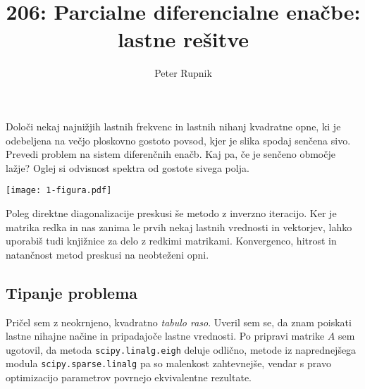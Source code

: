 \documentclass[a4paper,oneside,12pt]{article}
\title{206: Parcialne diferencialne enačbe: lastne rešitve}
\author{Peter Rupnik}
\begin{document}
\maketitle
\section{}

Določi nekaj najnižjih lastnih frekvenc in lastnih nihanj kvadratne opne, ki je odebeljena na večjo ploskovno gostoto povsod, kjer je slika spodaj senčena sivo. Prevedi problem na sistem diferenčnih enačb. Kaj pa, če je senčeno območje lažje? Oglej si odvisnost spektra od gostote sivega polja.
\begin{center}
    \texttt{[image: 1-figura.pdf]}
\end{center}
Poleg direktne diagonalizacije preskusi še metodo z inverzno iteracijo. Ker je matrika redka in nas zanima le prvih nekaj lastnih vrednosti in vektorjev, lahko uporabiš tudi knjižnice za delo z redkimi matrikami.
Konvergenco, hitrost in natančnost metod preskusi na neobteženi opni.


\subsection{Tipanje problema}
Pričel sem z neokrnjeno, kvadratno \emph{tabulo raso}. Uveril sem se, da znam poiskati lastne nihajne načine in pripadajoče lastne vrednosti. Po pripravi matrike $A$ sem ugotovil, da metoda \texttt{scipy.linalg.eigh} deluje odlično, metode iz naprednejšega modula \texttt{scipy.sparse.linalg} pa so malenkost zahtevnejše, vendar s pravo optimizacijo parametrov povrnejo ekvivalentne rezultate.
\end{document}
